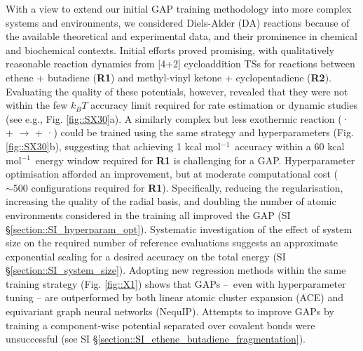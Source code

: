 \documentclass[twoside,twocolumn,9pt]{article}
\newcommand{\kcal}{kcal mol$^{-1}$}
\begin{document}
With a view to extend our initial GAP training methodology\cite{Young2021gap} into more complex systems and environments, we considered Diels-Alder (DA) reactions because of the available theoretical and experimental data,\cite{Black2012, Lording2020} and their prominence in chemical and biochemical contexts.\cite{Sato2021, MartCentelles2018, Briou2021} Initial efforts proved promising, with qualitatively reasonable reaction dynamics from [4+2] cycloaddition TSs for reactions between ethene + butadiene ({\bfseries{R1}}) and methyl-vinyl ketone + cyclopentadiene ({\bfseries{R2}}). Evaluating the quality of these potentials, however, revealed that they were not within the few $k_BT$ accuracy limit required for rate estimation or dynamic studies (see e.g., Fig. {\ref{fig::SX30}}a). A similarly complex but less exothermic reaction ({· +  $\rightarrow$  + ·}) could be trained using the same strategy and hyperparameters (Fig. \ref{fig::SX30}b), suggesting that achieving 1 \kcal~accuracy within a 60 \kcal~energy window required for {\bfseries{R1}} is challenging for a GAP. Hyperparameter optimisation afforded an improvement, but at moderate computational cost ($\sim500$ configurations required for {\bfseries{R1}}). Specifically, reducing the regularisation, increasing the quality of the radial basis, and doubling the number of atomic environments considered in the training all improved the GAP (SI §\ref{section::SI_hyperparam_opt}). Systematic investigation of the effect of system size on the required number of reference evaluations suggests an approximate exponential scaling for a desired accuracy on the total energy (SI §\ref{section::SI_system_size}). Adopting new regression methods within the same training strategy (Fig. \ref{fig::X1}) shows that GAPs – even with hyperparameter tuning – are outperformed by both linear atomic cluster expansion (ACE\cite{Drautz2019}) and equivariant graph neural networks (NequIP\cite{Batzner2021}). Attempts to improve GAPs by training a component-wise potential separated over covalent bonds were unsuccessful (see SI §\ref{section::SI_ethene_butadiene_fragmentation}).
\end{document}
